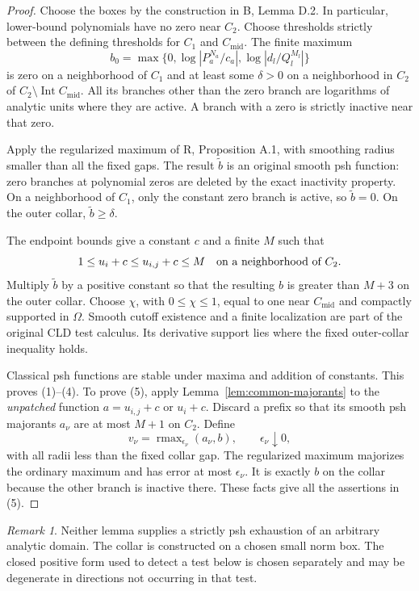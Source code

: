 \documentclass[11pt,a4paper]{article}
\numberwithin{equation}{section}
\theoremstyle{definition}
\theoremstyle{remark}
\newtheorem{remark}[theorem]{Remark}
\begin{document}
\begin{proof}
Choose the boxes by the construction in \textup{B}, Lemma D.2. In
particular, lower-bound polynomials have no zero near $C_2$. Choose
thresholds strictly between the defining thresholds for $C_1$ and
$C_{\mathrm{mid}}$. The finite maximum
\[
 b_0=\max\{0,\log|P_a^{N_a}/c_a|,
                     \log|d_l/Q_l^{M_l}|\}
\]
is zero on a neighborhood of $C_1$ and at least some $\delta>0$ on a
neighborhood in $C_2$ of $C_2\setminus\operatorname{Int}C_{\mathrm{mid}}$.
All its branches other than the zero branch are logarithms of analytic
units where they are active. A branch with a zero is strictly inactive
near that zero.

Apply the regularized maximum of \textup{R}, Proposition A.1, with
smoothing radius smaller than all the fixed gaps. The result $\widetilde b$
is an original smooth psh function: zero branches at polynomial zeros
are deleted by the exact inactivity property. On a neighborhood of
$C_1$, only the constant zero branch is active, so $\widetilde b=0$.
On the outer collar, $\widetilde b\geq\delta$.

The endpoint bounds give a constant $c$ and a finite $M$ such that
\[
 1\leq u_i+c\leq u_{i,j}+c\leq M
 \quad\hbox{on a neighborhood of }C_2.
\]
Multiply $\widetilde b$ by a positive constant so that the resulting $b$
is greater than $M+3$ on the outer collar. Choose $\chi$, with
$0\leq\chi\leq1$, equal to one near $C_{\mathrm{mid}}$ and compactly
supported in $\Omega$. Smooth cutoff existence and a finite localization
are part of the original CLD test calculus. Its derivative support lies
where the fixed outer-collar inequality holds.

Classical psh functions are stable under maxima and addition of constants.
This proves (1)--(4). To prove (5), apply Lemma~\ref{lem:common-majorants}
to the \emph{unpatched} function $a=u_{i,j}+c$ or $u_i+c$. Discard a
prefix so that its smooth psh majorants $a_\nu$ are at most $M+1$ on
$C_2$. Define
\[
 v_\nu=\operatorname{rmax}_{\epsilon_\nu}(a_\nu,b),
 \qquad \epsilon_\nu\downarrow0,
\]
with all radii less than the fixed collar gap. The regularized maximum
majorizes the ordinary maximum and has error at most $\epsilon_\nu$.
It is exactly $b$ on the collar because the other branch is inactive
there. These facts give all the assertions in (5).
\end{proof}

\begin{remark}
Neither lemma supplies a strictly psh exhaustion of an arbitrary analytic
domain. The collar is constructed on a chosen small norm box. The closed
positive form used to detect a test below is chosen separately and may
be degenerate in directions not occurring in that test.
\end{remark}
\end{document}
